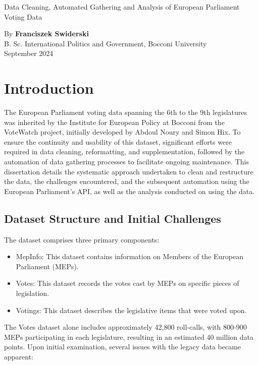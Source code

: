 \documentclass{article}
\begin{document}
\begin{titlepage}
  \centering

  {\Huge Data Cleaning, Automated Gathering and Analysis of European Parliament Voting Data\\}

\vspace{1cm}

  {By \textbf{Franciszek Swiderski}\\}
\vspace{1cm}
  {B. Sc. International Politics and Government, Bocconi University\\}
\vspace{1cm}
  {September 2024}

  \vspace{5cm} %


\end{titlepage}

\section{Introduction}

The European Parliament voting data spanning the 6th to the 9th legislatures was inherited by the Institute for European Policy at Bocconi from the VoteWatch project, initially developed by Abdoul Noury and Simon Hix. To ensure the continuity and usability of this dataset, significant efforts were required in data cleaning, reformatting, and supplementation, followed by the automation of data gathering processes to facilitate ongoing maintenance. This dissertation details the systematic approach undertaken to clean and restructure the data, the challenges encountered, and the subsequent automation using the European Parliament's API, as well as the analysis conducted on using the data.

\subsection{Dataset Structure and Initial Challenges}

The dataset comprises three primary components:


\begin{itemize}
    \item MepInfo: This dataset contains information on Members of the European Parliament (MEPs).
    \item Votes: This dataset records the votes cast by MEPs on specific pieces of legislation.
    \item Votings: This dataset describes the legislative items that were voted upon.
\end{itemize}
The Votes dataset alone includes approximately 42,800 roll-calls, with 800-900 MEPs participating in each legislature, resulting in an estimated 40 million data points. Upon initial examination, several issues with the legacy data became apparent:
\end{document}
